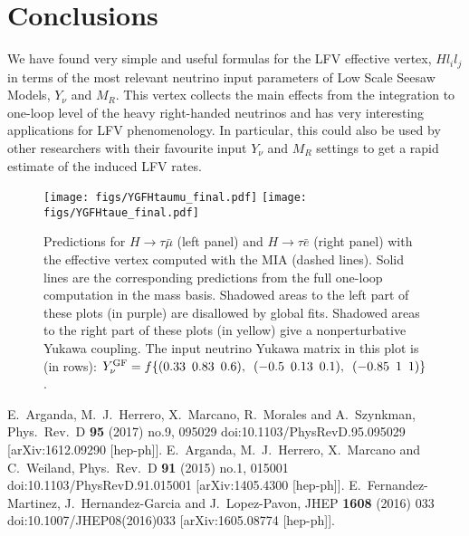 \documentclass{PoS}
\begin{document}
\section{Conclusions}
We have found very simple and useful formulas for the LFV effective vertex, $Hl_il_j$ in terms of the most relevant neutrino input parameters of Low Scale Seesaw Models, $Y_\nu$ and $M_R$. This vertex collects the main effects from the integration to one-loop level of the heavy right-handed neutrinos and has very interesting applications for LFV phenomenology. In particular, this could also be used by other researchers with their favourite input $Y_\nu$ and $M_R$ settings to get a rapid estimate of the induced LFV rates. 
\begin{figure}[t!]
\begin{center}
\texttt{[image: figs/YGFHtaumu\_final.pdf]}
\texttt{[image: figs/YGFHtaue\_final.pdf]}
\caption{Predictions for $H \to \tau \bar \mu$ (left panel) and 
$H \to \tau \bar e$ (right panel) with the effective vertex computed with the MIA (dashed lines). Solid lines are the corresponding predictions from the full one-loop computation in the mass basis. Shadowed areas to the left part of these plots (in purple) are disallowed by global fits. Shadowed areas to the right part of these plots (in yellow) give a nonperturbative Yukawa coupling. The input neutrino Yukawa matrix in this plot is (in rows): 
$Y_{\nu}^{\rm GF}=f \{(0.33 \,\,\, 0.83\,\,\,0.6),\,\,\, (-0.5 \,\,\, 0.13\,\,\,0.1), \,\,\,  (-0.85 \,\,\, 1\,\,\,1)\}$.}
\label{fig3}
\end{center}
\end{figure}

\begin{thebibliography}{99}
  E.~Arganda, M.~J.~Herrero, X.~Marcano, R.~Morales and A.~Szynkman,
  Phys.\ Rev.\ D {\bf 95} (2017) no.9,  095029
  doi:10.1103/PhysRevD.95.095029
  [arXiv:1612.09290 [hep-ph]].
  E.~Arganda, M.~J.~Herrero, X.~Marcano and C.~Weiland,
  Phys.\ Rev.\ D {\bf 91} (2015) no.1,  015001
  doi:10.1103/PhysRevD.91.015001
  [arXiv:1405.4300 [hep-ph]].
  E.~Fernandez-Martinez, J.~Hernandez-Garcia and J.~Lopez-Pavon,
  JHEP {\bf 1608} (2016) 033
  doi:10.1007/JHEP08(2016)033
  [arXiv:1605.08774 [hep-ph]].  
  
\end{thebibliography}
\end{document}

